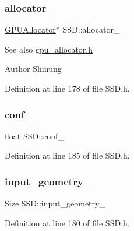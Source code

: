 \subsubsection{\texorpdfstring{allocator\+\_\+}{allocator\_}}
{\footnotesize\ttfamily \mbox{\hyperlink{class_g_p_u_allocator}{G\+P\+U\+Allocator}}$\ast$ S\+S\+D\+::allocator\+\_\+\hspace{0.3cm}{\ttfamily [private]}}

\begin{DoxySeeAlso}{See also}
\mbox{\hyperlink{gpu__allocator_8h}{gpu\+\_\+allocator.\+h}} 
\end{DoxySeeAlso}
\begin{DoxyAuthor}{Author}
Shinung 
\end{DoxyAuthor}


Definition at line 178 of file S\+S\+D.\+h.

\mbox{\label{class_s_s_d_a2deab37585140ff74fbec6e54f5407bf}} 
\subsubsection{\texorpdfstring{conf\+\_\+}{conf\_}}
{\footnotesize\ttfamily float S\+S\+D\+::conf\+\_\+\hspace{0.3cm}{\ttfamily [private]}}



Definition at line 185 of file S\+S\+D.\+h.

\mbox{\label{class_s_s_d_a3fe828551a5a53a3f43a481ae5d2d96a}} 
\subsubsection{\texorpdfstring{input\+\_\+geometry\+\_\+}{input\_geometry\_}}
{\footnotesize\ttfamily Size S\+S\+D\+::input\+\_\+geometry\+\_\+\hspace{0.3cm}{\ttfamily [private]}}



Definition at line 180 of file S\+S\+D.\+h.

\mbox{\label{class_s_s_d_a1c4d34f2dda5d4ca2dfabbebff7a0ddb}} 
